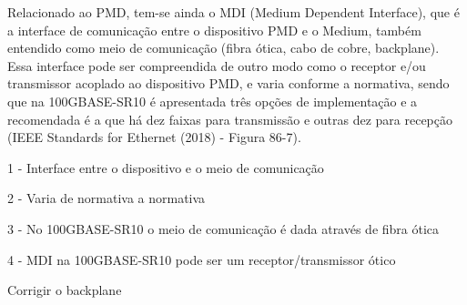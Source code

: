 \documentclass[a4paper,12pt]{article}
\begin{document}
Relacionado ao PMD, tem-se ainda o MDI (Medium Dependent Interface), que é a interface de comunicação entre o dispositivo PMD e o Medium, também entendido como meio de comunicação (fibra ótica, cabo de cobre, backplane). Essa interface pode ser compreendida de outro modo como o receptor e/ou transmissor acoplado ao dispositivo PMD, e varia conforme a normativa, sendo que na 100GBASE-SR10 é apresentada três opções de implementação e a recomendada é a que há dez faixas para transmissão e outras dez para recepção (IEEE Standards for Ethernet (2018) - Figura 86-7).

1 - Interface entre o dispositivo e o meio de comunicação

2 - Varia de normativa a normativa

3 - No 100GBASE-SR10 o meio de comunicação é dada através de fibra ótica

4 - MDI na 100GBASE-SR10 pode ser um receptor/transmissor ótico


Corrigir o backplane
\end{document}
